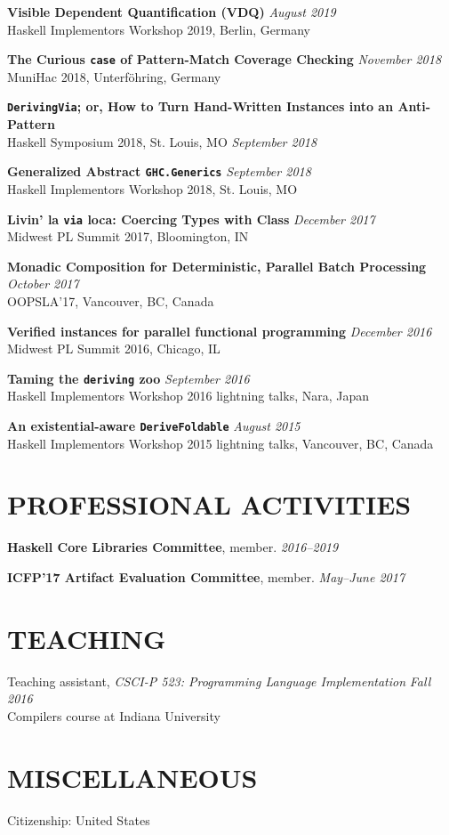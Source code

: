 \documentclass{res}
\begin{document}
\begin{resume}
    \textbf{Visible Dependent Quantification (VDQ)} \hfill \textit{August 2019} \\
    Haskell Implementors Workshop 2019, Berlin, Germany

    \textbf{The Curious \texttt{case} of Pattern-Match Coverage Checking} \hfill \textit{November 2018} \\
    MuniHac 2018, Unterföhring, Germany

    \textbf{\texttt{DerivingVia}; or, How to Turn Hand-Written Instances into an Anti-Pattern} \\
    Haskell Symposium 2018, St. Louis, MO \hfill \textit{September 2018}

    \textbf{Generalized Abstract \texttt{GHC.Generics}} \hfill \textit{September 2018} \\
    Haskell Implementors Workshop 2018, St. Louis, MO

    \textbf{Livin' la \texttt{via} loca: Coercing Types with Class} \hfill \textit{December 2017} \\
    Midwest PL Summit 2017, Bloomington, IN

    \textbf{Monadic Composition for Deterministic, Parallel Batch Processing} \hfill \textit{October 2017} \\
    OOPSLA'17, Vancouver, BC, Canada

    \textbf{Verified instances for parallel functional programming} \hfill \textit{December 2016} \\
    Midwest PL Summit 2016, Chicago, IL

    \textbf{Taming the \texttt{deriving} zoo} \hfill \textit{September 2016} \\
    Haskell Implementors Workshop 2016 lightning talks, Nara, Japan

    \textbf{An existential-aware \texttt{DeriveFoldable}} \hfill \textit{August 2015} \\
    Haskell Implementors Workshop 2015 lightning talks, Vancouver, BC, Canada

\section{PROFESSIONAL ACTIVITIES}
    \textbf{Haskell Core Libraries Committee}, member. \hfill \textit{2016--2019}

    \textbf{ICFP'17 Artifact Evaluation Committee}, member. \hfill \textit{May--June 2017}

\section{TEACHING}
    Teaching assistant, \textit{CSCI-P 523: Programming Language Implementation} \hfill \textit{Fall 2016} \\
    Compilers course at Indiana University

\section{MISCELLANEOUS}
    Citizenship: United States

\end{resume}
\end{document}
